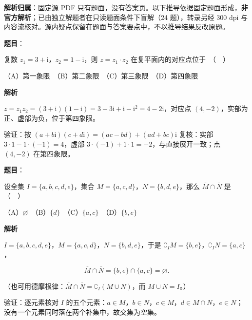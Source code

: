 

\begin{gknotice}
\textbf{解析归属}：固定源 PDF 只有题面，没有答案页。以下推导依据固定题面形成，\textbf{非官方解析}；已由独立解题者在只读题面条件下盲解（24 题），转录另经 300 dpi 与内容流核对。源内疑点保留在题面与答案要点中，不以推导结果反改原题。
\end{gknotice}

\begin{answer}

\textbf{题目}：

复数 $z_1 = 3 + \mathrm{i}$，$z_2 = 1 - \mathrm{i}$，则 $z = z_1 \cdot z_2$ 在复平面内的对应点位于　（　）

（A）第一象限　（B）第二象限　（C）第三象限　（D）第四象限

\textbf{解析}

$z=z_1z_2=(3+\mathrm i)(1-\mathrm i)=3-3\mathrm i+\mathrm i-\mathrm i^2=4-2\mathrm i$，对应点 $(4,-2)$，实部为正、虚部为负，位于第四象限。

验证：按 $(a+b\mathrm i)(c+d\mathrm i)=(ac-bd)+(ad+bc)\mathrm i$ 复核：实部 $3\cdot1-1\cdot(-1)=4$，虚部 $3\cdot(-1)+1\cdot1=-2$，与直接展开一致；点 $(4,-2)$ 在第四象限。


\par\medskip

\end{answer}
\begin{answer}

\textbf{题目}：

设全集 $I = \{a, b, c, d, e\}$，集合 $M = \{a, c, d\}$，$N = \{b, d, e\}$，那么 $\overline{M} \cap \overline{N}$ 是　（　）

（A）$\varnothing$　（B）$\{d\}$　（C）$\{a, c\}$　（D）$\{b, e\}$

\textbf{解析}

$I=\{a,b,c,d,e\}$，$M=\{a,c,d\}$，$N=\{b,d,e\}$，于是 $\complement_I M=\{b,e\}$，$\complement_I N=\{a,c\}$，

\nopagebreak[4]
\[\overline M\cap\overline N=\{b,e\}\cap\{a,c\}=\varnothing .\]

（也可用德摩根律：$\overline M\cap\overline N=\complement_I(M\cup N)$，而 $M\cup N=I$。）

验证：逐元素核对 $I$ 的五个元素：$a\in M$，$b\in N$，$c\in M$，$d\in M\cap N$，$e\in N$；没有一个元素同时落在两个补集中，故交集为空集。


\par\medskip

\end{answer}
